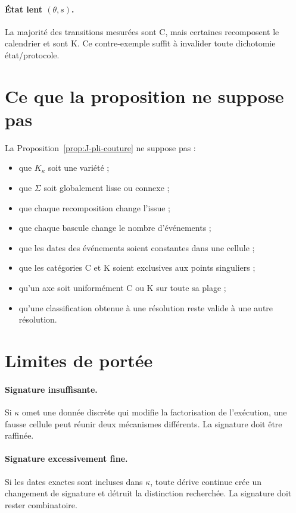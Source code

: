 \paragraph{État lent $(\theta,s)$.}
La majorité des transitions mesurées sont C, mais certaines recomposent
le calendrier et sont K. Ce contre-exemple suffit à invalider toute
dichotomie état/protocole.

\section{Ce que la proposition ne suppose pas}
\label{annexe-J-non-hypotheses}

La Proposition~\ref{prop:J-pli-couture} ne suppose pas :
\begin{itemize}
\item que $K_\kappa$ soit une variété ;
\item que $\Sigma$ soit globalement lisse ou connexe ;
\item que chaque recomposition change l'issue ;
\item que chaque bascule change le nombre d'événements ;
\item que les dates des événements soient constantes dans une cellule ;
\item que les catégories C et K soient exclusives aux points
singuliers ;
\item qu'un axe soit uniformément C ou K sur toute sa plage ;
\item qu'une classification obtenue à une résolution reste valide à une
autre résolution.
\end{itemize}

\section{Limites de portée}
\label{annexe-J-limites}

\paragraph{Signature insuffisante.}
Si $\kappa$ omet une donnée discrète qui modifie la factorisation de
l'exécution, une fausse cellule peut réunir deux mécanismes différents.
La signature doit être raffinée.

\paragraph{Signature excessivement fine.}
Si les dates exactes sont incluses dans $\kappa$, toute dérive continue
crée un changement de signature et détruit la distinction recherchée.
La signature doit rester combinatoire.

